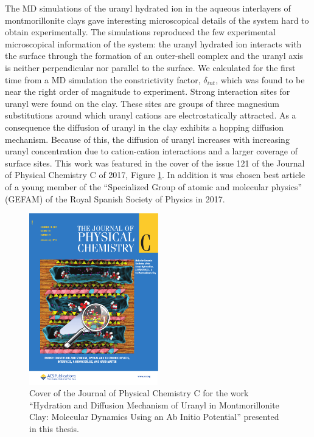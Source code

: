The MD simulations of the uranyl hydrated ion in the aqueous interlayers of 
montmorillonite clays gave interesting microscopical details of the system hard to 
obtain experimentally\cite{JPC_SPC_2017}. The simulations reproduced the few experimental 
microscopical information of 
the system: the uranyl hydrated ion interacts with the surface through the formation of an 
outer-shell complex\cite{GeoCosmoAct_Catalano_2005} and the uranyl axis is neither perpendicular nor 
parallel to the surface\cite{MinWatIntClEq_Denecke_1999}. We 
calculated for the first time from a MD simulation the constrictivity factor, 
$\delta_{int}$, which was found to be near the right order of magnitude to experiment. Strong 
interaction sites for uranyl were found on the clay. These sites are groups of three magnesium 
substitutions around which uranyl cations are electrostatically attracted. As a 
consequence the diffusion of uranyl in the clay exhibits a hopping diffusion mechanism. 
Because of this, the diffusion of uranyl increases with increasing 
uranyl concentration due to cation-cation interactions and a larger coverage of 
surface sites. This work was featured in the cover of the issue 121 of the Journal 
of Physical 
Chemistry C of 2017, Figure \ref{cover2}. In addition it was chosen best article of a young member 
of the ``Specialized Group of atomic and molecular physics'' (GEFAM) of the Royal Spanish 
Society of Physics in 2017.

\begin{figure}[ht!]
     \centering
         \includegraphics[width=0.5\textwidth]{images/cover_JPCC2017.pdf} 
        \caption[Cover Journal Physical Chemistry C]{Cover of the Journal of Physical Chemistry C 
for the work ``Hydration and Diffusion Mechanism of Uranyl in Montmorillonite Clay: Molecular 
Dynamics Using an Ab Initio Potential'' presented in this thesis.
\cite{JPC_SPC_2017} }
        \label{cover2}
\end{figure}

